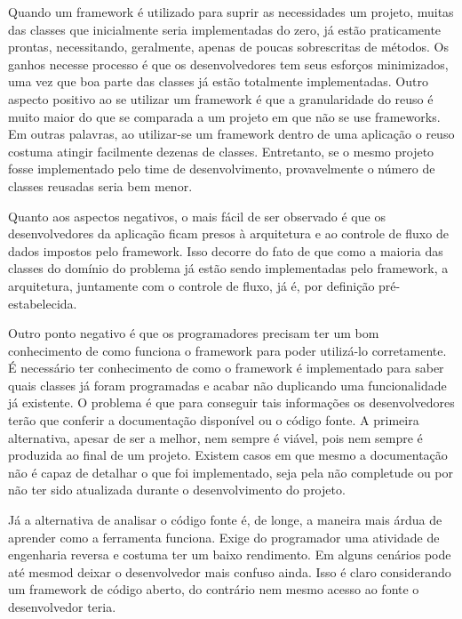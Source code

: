 \documentclass[
    12pt,       %
    openright,      %
    twoside,      %
    a4paper,      %
    english,      %
    french,       %
    spanish,      %
    brazil,       %
    ]{abntex2}
\begin{document}
          Quando um framework é utilizado para suprir as necessidades um projeto, muitas
          das classes que inicialmente seria implementadas do zero, já estão praticamente
          prontas, necessitando, geralmente, apenas de poucas sobrescritas de métodos.
          Os ganhos necesse processo é que os desenvolvedores tem seus esforços
          minimizados, uma vez que boa parte das classes já estão totalmente implementadas.
          Outro aspecto positivo ao se utilizar um framework é que a granularidade do
          reuso é muito maior do que se comparada a um projeto em que não se use frameworks.
          Em outras palavras, ao utilizar-se um framework dentro de uma aplicação o reuso
          costuma atingir facilmente dezenas de classes. Entretanto, se o mesmo projeto
          fosse implementado pelo time de desenvolvimento, provavelmente o número de
          classes reusadas seria bem menor.

          Quanto aos aspectos negativos, o mais fácil de ser observado é que os
          desenvolvedores da aplicação ficam presos à arquitetura e ao controle
          de fluxo de dados impostos pelo framework. Isso decorre do fato de que como a
          maioria das classes do domínio do problema já estão sendo implementadas pelo
          framework, a arquitetura, juntamente com o controle de fluxo, já é, por
          definição pré-estabelecida.

          Outro ponto negativo é que os programadores precisam ter um bom conhecimento
          de como funciona o framework para poder utilizá-lo corretamente. É necessário
          ter conhecimento de como o framework é implementado para saber quais classes
          já foram programadas e acabar não duplicando uma funcionalidade já existente.
          O problema é que para conseguir tais informações os desenvolvedores terão que
          conferir a documentação disponível ou o código fonte. A primeira alternativa,
          apesar de ser a melhor, nem sempre é viável, pois nem sempre é produzida ao
          final de um projeto. Existem casos em que mesmo a documentação não é capaz
          de detalhar o que foi implementado, seja pela não completude ou por não ter
          sido atualizada durante o desenvolvimento do projeto.

          Já a alternativa de analisar o código fonte é, de longe, a maneira mais árdua
          de aprender como a ferramenta funciona. Exige do programador uma atividade
          de engenharia reversa e costuma ter um baixo rendimento. Em alguns cenários
          pode até mesmod deixar o desenvolvedor mais confuso ainda. Isso é claro
          considerando um framework de código aberto, do contrário nem mesmo acesso
          ao fonte o desenvolvedor teria.
\end{document}
